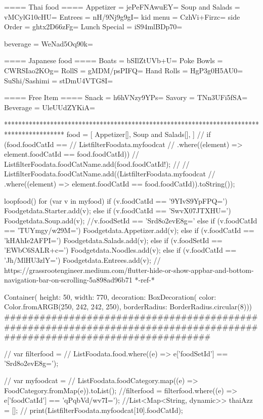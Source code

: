 ==== Thai food ====
Appetizer = jePeFNAwuEY=
Soup and Salads = vMCylG10cHU=
Entrees = nH/9Nj9g9gI=
kid menu = CzhVi+Firzc=
side Order = ghtx2D66zFg=
Lunch Special = iS94mlBDp70=


beverage = WeNad5Oq90k=


==== Japanese food ====
Boats = bSIlZtUVb+U=
Poke Bowls = CWRSIao2KOg=
RollS = gMDM/psPIFQ=
Hand Rolls = HgP3g0H5AU0=
SuShi/Sashimi = stDmU4VTG8I=

==== Free Item ====
Snack = h6hVNzy9YPs=
Savory = TNn3UFi5fSA=
Beverage = UleUUdZYKiA=


*****************************************************************************************
food = [
    Appetizer[],
    Soup and Salads[],
]
// if (food.foodCatId ==
      //     ListfilterFoodata.myfoodcat
      //         .where((element) => element.foodCatId == food.foodCatId)) {
      //   ListfilterFoodata.foodCatName.add(food.foodCatId!);
      // }
      // ListfilterFoodata.foodCatName.add((ListfilterFoodata.myfoodcat
      //     .where((element) => element.foodCatId == food.foodCatId)).toString());

      loopfood() {
    for (var v in myfood) {
      if (v.foodCatId == '9YIvS9YpFPQ=') {
        Foodgetdata.Starter.add(v);
      } else if (v.foodCatId == 'SwvX07JTXHU=') {
        Foodgetdata.Soup.add(v);
        //v.foodSetId == 'Srd8o2evE8g='
      } else if (v.foodCatId == 'TUYmgy/w29M=') {
        Foodgetdata.Appetizer.add(v);
      } else if (v.foodCatId == 'kHAhIe2AFPI=') {
        Foodgetdata.Salads.add(v);
      } else if (v.foodSetId == 'EWbC6SALR+c=') {
        Foodgetdata.Noodles.add(v);
      } else if (v.foodCatId == 'Jh/MlHU3zlY=') {
        Foodgetdata.Entrees.add(v);
      }
    }
  }
  // https://grassrootengineer.medium.com/flutter-hide-or-show-appbar-and-bottom-navigation-bar-on-scrolling-5a898ad96b71 *-ref-*

  Container(
                        height: 50,
                        width: 770,
                        decoration: BoxDecoration(
                            color: Color.fromARGB(250, 242, 242, 250),
                            borderRadius: BorderRadius.circular(8)))
#########################################################################################################################


                            // var filterfood =
                            //     ListFoodata.food.where((e) => e['foodSetId'] == 'Srd8o2evE8g=');
                          
                            // var myfoodcat =
                            //     ListFoodata.foodCategory.map((e) => FoodCategory.fromMap(e)).toList();
                            //filterfood = filterfood.where((e) => e['foodCatId'] == 'qPqbVd/wv7I=');
                            //List<Map<String, dynamic>> thaiAzz = [];
                            // print(ListfilterFoodata.myfoodcat[10].foodCatId);
                            
                            